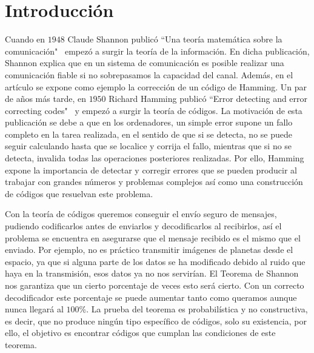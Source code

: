 


\chapter*{Introducción}



Cuando en $1948$ Claude Shannon publicó ``Una teoría matemática sobre la comunicación"\ \cite{Shannon} empezó a surgir la teoría de la información. En dicha publicación, Shannon explica que en un sistema de comunicación es posible realizar una comunicación fiable si no sobrepasamos la capacidad del canal. Además, en el artículo se expone como ejemplo la corrección de un código de Hamming. Un par de años más tarde, en $1950$ Richard Hamming publicó ``Error detecting and error correcting codes"\ \cite{Hamming} y empezó a surgir la teoría de códigos. La motivación de esta publicación se debe a que en los ordenadores, un simple error supone un fallo completo en la tarea realizada, en el sentido de que si se detecta, no se puede seguir calculando hasta que se localice y corrija el fallo, mientras que si no se detecta, invalida todas las operaciones posteriores realizadas. Por ello, Hamming expone la importancia de detectar y corregir errores que se pueden producir al trabajar con grandes números y problemas complejos así como una construcción de códigos que resuelvan este problema.


Con la teoría de códigos queremos conseguir el envío seguro de mensajes, pudiendo codificarlos antes de enviarlos y decodificarlos al recibirlos, así el problema se encuentra en asegurarse que el mensaje recibido es el mismo que el enviado. Por ejemplo, no es práctico transmitir imágenes de planetas desde el espacio, ya que si alguna parte de los datos se ha modificado debido al ruido que haya en la transmisión, esos datos ya no nos servirían. El Teorema de Shannon nos garantiza que un cierto porcentaje de veces esto será cierto. Con un correcto decodificador este porcentaje se puede aumentar tanto como queramos aunque nunca llegará al $100$\%. La prueba del teorema es probabilística y no constructiva, es decir, que no produce ningún tipo específico de códigos, solo su existencia, por ello, el objetivo es encontrar códigos que cumplan las condiciones de este teorema.

